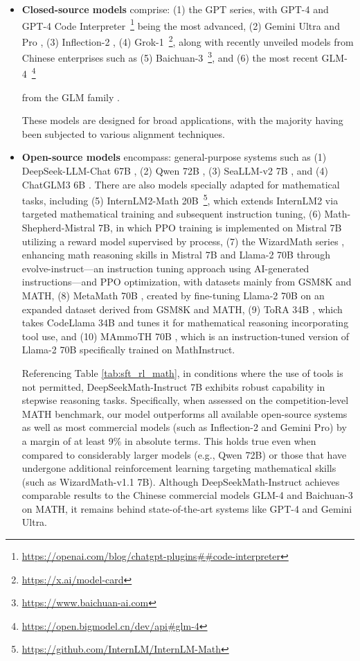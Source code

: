 \begin{itemize}[topsep=0pt]
\begin{itemize}[topsep=0pt]
    \item \textbf{Closed-source models} comprise: (1) the GPT series, with GPT-4 \citep{gpt4} and GPT-4 Code Interpreter~\footnote{\url{https://openai.com/blog/chatgpt-plugins\#\#code-interpreter}} being the most advanced, (2) Gemini Ultra and Pro \citep{gemini}, (3) Inflection-2 \citep{inflection-2}, (4) Grok-1~\footnote{\url{https://x.ai/model-card}},
    along with recently unveiled models from Chinese enterprises such as (5) Baichuan-3~\footnote{\url{https://www.baichuan-ai.com}},
    and (6) the most recent GLM-4~\footnote{\url{https://open.bigmodel.cn/dev/api\#glm-4}}

    from the GLM family \citep{glm}.

These models are designed for broad applications, with the majority having been subjected to various alignment techniques.

\item \textbf{Open-source models} encompass: general-purpose systems such as (1) DeepSeek-LLM-Chat 67B \citep{deepseek-llm}, (2) Qwen 72B \citep{qwen}, (3) SeaLLM-v2 7B \citep{seallm}, and (4) ChatGLM3 6B \citep{chatglm3}. There are also models specially adapted for mathematical tasks, including (5) InternLM2-Math 20B~\footnote{\url{https://github.com/InternLM/InternLM-Math}}, which extends InternLM2 via targeted mathematical training and subsequent instruction tuning, (6) Math-Shepherd-Mistral 7B, in which PPO training \citep{schulman2017proximal} is implemented on Mistral 7B \citep{mistral} utilizing a reward model supervised by process, (7) the WizardMath series \citep{wizardmath}, enhancing math reasoning skills in Mistral 7B and Llama-2 70B \citep{llama2} through evolve-instruct—an instruction tuning approach using AI-generated instructions—and PPO optimization, with datasets mainly from GSM8K and MATH, (8) MetaMath 70B \citep{metamath}, created by fine-tuning Llama-2 70B on an expanded dataset derived from GSM8K and MATH, (9) ToRA 34B \cite{tora}, which takes CodeLlama 34B and tunes it for mathematical reasoning incorporating tool use, and (10) MAmmoTH 70B \citep{MathInstruct}, which is an instruction-tuned version of Llama-2 70B specifically trained on MathInstruct.

Referencing Table \ref{tab:sft_rl_math}, in conditions where the use of tools is not permitted, DeepSeekMath-Instruct 7B exhibits robust capability in stepwise reasoning tasks. Specifically, when assessed on the competition-level MATH benchmark, our model outperforms all available open-source systems as well as most commercial models (such as Inflection-2 and Gemini Pro) by a margin of at least 9\% in absolute terms. This holds true even when compared to considerably larger models (e.g., Qwen 72B) or those that have undergone additional reinforcement learning targeting mathematical skills (such as WizardMath-v1.1 7B). Although DeepSeekMath-Instruct achieves comparable results to the Chinese commercial models GLM-4 and Baichuan-3 on MATH, it remains behind state-of-the-art systems like GPT-4 and Gemini Ultra.


\end{itemize}
\end{itemize}
